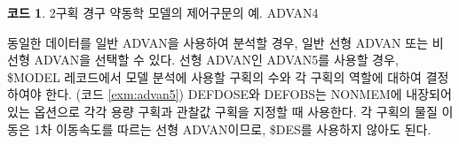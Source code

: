 \documentclass[
  10pt,
  krantz2,
  a4paper]{krantz}
\newenvironment{Shaded}{\begin{snugshade}}{\end{snugshade}}
\newcommand{\DecValTok}[1]{\textcolor[rgb]{0.00,0.00,0.81}{#1}}
\newcommand{\FloatTok}[1]{\textcolor[rgb]{0.00,0.00,0.81}{#1}}
\newcommand{\NormalTok}[1]{#1}
\newcommand{\OperatorTok}[1]{\textcolor[rgb]{0.81,0.36,0.00}{\textbf{#1}}}
\newenvironment{Shaded}{\begin{snugshade}}{\end{snugshade}}
\theoremstyle{definition}
\theoremstyle{definition}
\newtheorem{example}{코드}[chapter]
\theoremstyle{definition}
\theoremstyle{remark}
\begin{document}
\begin{Shaded}
\end{Shaded}

\begin{example}
\protect\hypertarget{exm:advan4}{}{\label{exm:advan4} }2구획 경구 약동학 모델의 제어구문의 예. ADVAN4
\end{example}

동일한 데이터를 일반 ADVAN을 사용하여 분석할 경우, 일반 선형 ADVAN 또는 비선형 ADVAN을 선택할 수 있다. 선형 ADVAN인 ADVAN5를 사용할 경우, \$MODEL 레코드에서 모델 분석에 사용할 구획의 수와 각 구획의 역할에 대하여 결정하여야 한다. (코드 \ref{exm:advan5}) DEFDOSE와 DEFOBS는 NONMEM에 내장되어 있는 옵션으로 각각 용량 구획과 관찰값 구획을 지정할 때 사용한다. 각 구획의 물질 이동은 1차 이동속도를 따르는 선형 ADVAN이므로, \$DES를 사용하지 않아도 된다.
\end{document}
